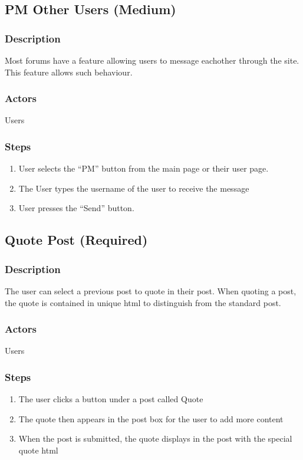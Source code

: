 \documentclass[12pt]{scrartcl}
\begin{document}
\subsection{PM Other Users (Medium)}
\subsubsection{Description}

Most forums have a feature allowing users to message eachother through the site. This
feature allows such behaviour.

\subsubsection{Actors}

Users

\subsubsection{Steps}
\begin{enumerate}
\item User selects the ``PM'' button from the main page or their user page.
\item The User types the username of the user to receive the message
\item User presses the ``Send'' button.
\end{enumerate}

\subsection{Quote Post (Required)}
\subsubsection{Description}

The user can select a previous post to quote in their post. When quoting a post, the quote is contained in unique html to distinguish from the standard post. 
\subsubsection{Actors}

Users

\subsubsection{Steps}

\begin{enumerate}
\item The user clicks a button under a post called Quote
\item The quote then appears in the post box for the user to add more content
\item When the post is submitted, the quote displays in the post with the special quote html
\end{enumerate}
\end{document}
